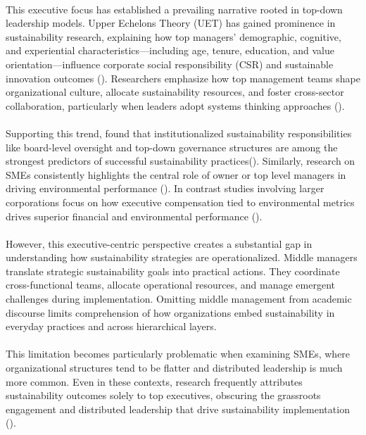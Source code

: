 	\paragraph*{} This executive focus has established a prevailing narrative rooted in top-down leadership models. Upper Echelons Theory (UET) has gained prominence in sustainability research, explaining how top managers' demographic, cognitive, and experiential characteristics—including age, tenure, education, and value orientation—influence corporate social responsibility (CSR) and sustainable innovation outcomes (\textcite{Waldman2008, Ioannou2015}). Researchers emphasize how top management teams shape organizational culture, allocate sustainability resources, and foster cross-sector collaboration, particularly when leaders adopt systems thinking approaches (\textcite{Dyllick2016}).
	
	\paragraph*{} Supporting this trend, \citeauthor{keil2024c} found that institutionalized sustainability responsibilities like board-level oversight and top-down governance structures are among the strongest predictors of successful sustainability practices(\textcite{keil2024c}). Similarly, research on SMEs consistently highlights the central role of owner or top level managers in driving environmental performance (\textcite{kutzschbach2021c}). In contrast studies involving larger corporations focus on how executive compensation tied to environmental metrics drives superior financial and environmental performance (\textcite{Eccles2014}).
	
	\paragraph*{} However, this executive-centric perspective creates a substantial gap in understanding how sustainability strategies are operationalized. Middle managers translate strategic sustainability goals into practical actions. They coordinate cross-functional teams, allocate operational resources, and manage emergent challenges during implementation. Omitting middle management from academic discourse limits comprehension of how organizations embed sustainability in everyday practices and across hierarchical layers.
	
	\paragraph*{} This limitation becomes particularly problematic when examining SMEs, where organizational structures tend to be flatter and distributed leadership is much more common. Even in these contexts, research frequently attributes sustainability outcomes solely to top executives, obscuring the grassroots engagement and distributed leadership that drive sustainability implementation (\textcite{birkinshaw2010}).
	
